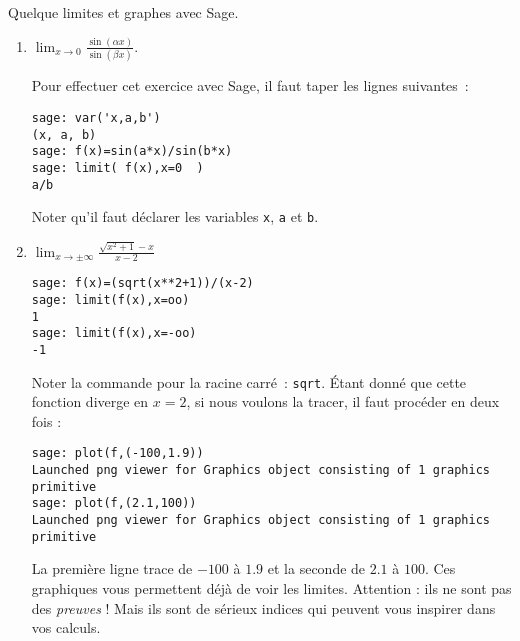 \begin{example}     \label{ExCWDRooKxnjGL}
    Quelque limites et graphes avec Sage.

    \begin{enumerate}

		\item
			$\lim_{x\to 0} \frac{ \sin(\alpha x) }{ \sin(\beta x) }$.

			Pour effectuer cet exercice avec Sage, il faut taper les lignes suivantes~:

            
\begin{verbatim}
sage: var('x,a,b')
(x, a, b)
sage: f(x)=sin(a*x)/sin(b*x)
sage: limit( f(x),x=0  )
a/b
\end{verbatim}

			Noter qu'il faut déclarer les variables \texttt{x}, \texttt{a} et \texttt{b}.

		\item
			$\lim_{x\to \pm\infty} \frac{ \sqrt{x^2+1}-x }{ x-2 }$

            \begin{verbatim}
sage: f(x)=(sqrt(x**2+1))/(x-2)
sage: limit(f(x),x=oo)
1
sage: limit(f(x),x=-oo)
-1
            \end{verbatim}

			Noter la commande pour la racine carré~: \texttt{sqrt}. Étant donné que cette fonction diverge en $x=2$, si nous voulons la tracer, il faut procéder en deux fois :

            \begin{verbatim}
sage: plot(f,(-100,1.9))
Launched png viewer for Graphics object consisting of 1 graphics primitive
sage: plot(f,(2.1,100))
Launched png viewer for Graphics object consisting of 1 graphics primitive
            \end{verbatim}
			La première ligne trace de $-100$ à $1.9$ et la seconde de $2.1$ à $100$. Ces graphiques vous permettent déjà de voir les limites. Attention : ils ne sont pas des \emph{preuves} ! Mais ils sont de sérieux indices qui peuvent vous inspirer dans vos calculs.

	\end{enumerate}
\end{example}

